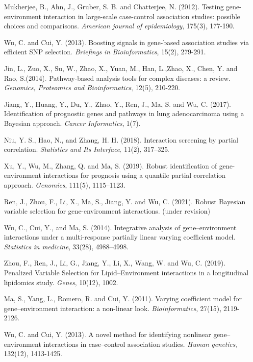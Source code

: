 \documentclass[12pt]{article}
\begin{document}
\begin{thebibliography}{99}
Mukherjee, B., Ahn, J., Gruber, S. B. and Chatterjee, N. (2012). Testing gene-environment interaction in large-scale case-control association studies: possible choices and comparisons. \emph{American journal of epidemiology}, 175(3), 177-190.

Wu, C. and Cui, Y. (2013). Boosting signals in gene-based association studies via efficient SNP selection. \emph{Briefings in Bioinformatics}, 15(2), 279-291.

Jin, L., Zuo, X., Su, W., Zhao, X., Yuan, M., Han, L.,Zhao, X., Chen, Y. and Rao, S.(2014). Pathway-based analysis tools for complex diseases: a review. \emph{Genomics, Proteomics and Bioinformatics}, 12(5), 210-220.

Jiang, Y., Huang, Y., Du, Y., Zhao, Y., Ren, J., Ma, S. and Wu, C. (2017). Identification of prognostic genes and pathways in lung adenocarcinoma using a Bayesian approach. \emph{Cancer Informatics}, 1(7).


Niu, Y. S., Hao, N., and Zhang, H. H. (2018). Interaction screening by partial correlation. \emph{Statistics and Its Interface}, 11(2), 317--325.

Xu, Y., Wu, M., Zhang, Q. and Ma, S. (2019). Robust identification of gene-environment interactions for prognosis using a quantile partial correlation approach. \emph{Genomics}, 111(5), 1115--1123.

Ren, J., Zhou, F., Li, X., Ma, S., Jiang, Y. and Wu, C. (2021). Robust Bayesian variable selection for gene-environment interactions. (under revision)

Wu, C., Cui, Y., and Ma, S. (2014). Integrative analysis of gene–environment interactions under a multi‐response partially linear varying coefficient model. \emph{Statistics in medicine}, 33(28), 4988--4998.


Zhou, F., Ren, J., Li, G., Jiang, Y., Li, X., Wang, W. and Wu, C. (2019). Penalized Variable Selection for Lipid–Environment interactions in a longitudinal lipidomics study. \emph{Genes}, 10(12), 1002.


Ma, S., Yang, L., Romero, R. and Cui, Y. (2011). Varying coefficient model for gene–environment interaction: a non-linear look. \emph{Bioinformatics}, 27(15), 2119-2126.

Wu, C. and Cui, Y. (2013). A novel method for identifying nonlinear gene–environment interactions in case–control association studies. \emph{Human genetics}, 132(12), 1413-1425.


\end{thebibliography}
\end{document}

